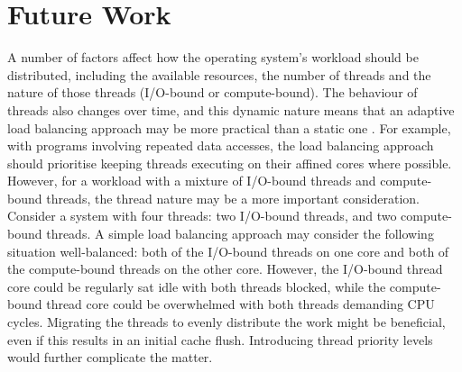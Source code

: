 \documentclass[bsc,frontabs,singlespacing,parskip,deptreport]{infthesis}
\begin{document}

\section{Future Work} \label{future-work}
A number of factors affect how the operating system's workload should be distributed, including the available resources, the number of threads and the nature of those threads (I/O-bound or compute-bound). The behaviour of threads also changes over time, and this dynamic nature means that an adaptive load balancing approach may be more practical than a static one \cite{adaptive-sched}. For example, with programs involving repeated data accesses, the load balancing approach should prioritise keeping threads executing on their affined cores where possible. However, for a workload with a mixture of I/O-bound threads and compute-bound threads, the thread nature may be a more important consideration. Consider a system with four threads: two I/O-bound threads, and two compute-bound threads. A simple load balancing approach may consider the following situation well-balanced: both of the I/O-bound threads on one core and both of the compute-bound threads on the other core. However, the I/O-bound thread core could be regularly sat idle with both threads blocked, while the compute-bound thread core could be overwhelmed with both threads demanding CPU cycles. Migrating the threads to evenly distribute the work might be beneficial, even if this results in an initial cache flush. Introducing thread priority levels would further complicate the matter. 
\end{document}
